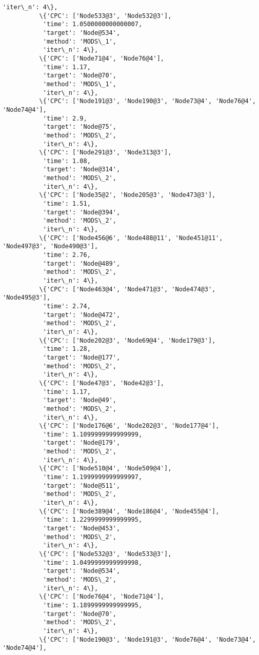\documentclass[11pt]{article}
\begin{document}
\begin{Verbatim}[commandchars=\\\{\}]
           'iter\_n': 4\},
          \{'CPC': ['Node533@3', 'Node532@3'],
           'time': 1.0500000000000007,
           'target': 'Node@534',
           'method': 'MODS\_1',
           'iter\_n': 4\},
          \{'CPC': ['Node71@4', 'Node76@4'],
           'time': 1.17,
           'target': 'Node@70',
           'method': 'MODS\_1',
           'iter\_n': 4\},
          \{'CPC': ['Node191@3', 'Node190@3', 'Node73@4', 'Node76@4', 'Node74@4'],
           'time': 2.9,
           'target': 'Node@75',
           'method': 'MODS\_2',
           'iter\_n': 4\},
          \{'CPC': ['Node291@3', 'Node313@3'],
           'time': 1.08,
           'target': 'Node@314',
           'method': 'MODS\_2',
           'iter\_n': 4\},
          \{'CPC': ['Node35@2', 'Node205@3', 'Node473@3'],
           'time': 1.51,
           'target': 'Node@394',
           'method': 'MODS\_2',
           'iter\_n': 4\},
          \{'CPC': ['Node456@6', 'Node488@11', 'Node451@11', 'Node497@3', 'Node490@3'],
           'time': 2.76,
           'target': 'Node@489',
           'method': 'MODS\_2',
           'iter\_n': 4\},
          \{'CPC': ['Node463@4', 'Node471@3', 'Node474@3', 'Node495@3'],
           'time': 2.74,
           'target': 'Node@472',
           'method': 'MODS\_2',
           'iter\_n': 4\},
          \{'CPC': ['Node202@3', 'Node69@4', 'Node179@3'],
           'time': 1.28,
           'target': 'Node@177',
           'method': 'MODS\_2',
           'iter\_n': 4\},
          \{'CPC': ['Node47@3', 'Node42@3'],
           'time': 1.17,
           'target': 'Node@49',
           'method': 'MODS\_2',
           'iter\_n': 4\},
          \{'CPC': ['Node176@6', 'Node202@3', 'Node177@4'],
           'time': 1.1099999999999999,
           'target': 'Node@179',
           'method': 'MODS\_2',
           'iter\_n': 4\},
          \{'CPC': ['Node510@4', 'Node509@4'],
           'time': 1.1999999999999997,
           'target': 'Node@511',
           'method': 'MODS\_2',
           'iter\_n': 4\},
          \{'CPC': ['Node389@4', 'Node186@4', 'Node455@4'],
           'time': 1.2299999999999995,
           'target': 'Node@453',
           'method': 'MODS\_2',
           'iter\_n': 4\},
          \{'CPC': ['Node532@3', 'Node533@3'],
           'time': 1.0499999999999998,
           'target': 'Node@534',
           'method': 'MODS\_2',
           'iter\_n': 4\},
          \{'CPC': ['Node76@4', 'Node71@4'],
           'time': 1.1899999999999995,
           'target': 'Node@70',
           'method': 'MODS\_2',
           'iter\_n': 4\},
          \{'CPC': ['Node190@3', 'Node191@3', 'Node76@4', 'Node73@4', 'Node74@4'],

\end{Verbatim}
\end{document}
